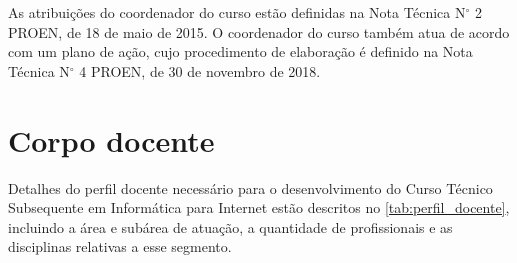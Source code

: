 \documentclass[
	12pt,				%
	openright,			%
	twoside,			%
	a4paper,			%
	chapter=TITLE,		%
	english,			%
	french,				%
	spanish,			%
	brazil,				%
	]{abntex2}
\newcommand{\nord}[1]{N$^\circ$ #1}
\begin{document}
As atribuições do coordenador do curso estão definidas na Nota Técnica \nord{2} PROEN, de 18 de maio de 2015. O coordenador do curso também atua de acordo com um plano de ação, cujo procedimento de elaboração é definido na Nota Técnica \nord{4} PROEN, de 30 de novembro de 2018.


\chapter{Corpo docente}


Detalhes do perfil docente necessário para o desenvolvimento do Curso Técnico Subsequente em Informática para Internet  estão descritos no \autoref{tab:perfil_docente},  incluindo a área e subárea de atuação, a quantidade de profissionais e as disciplinas relativas a esse segmento.
\end{document}
